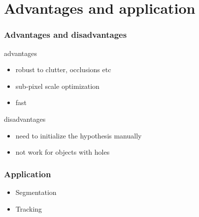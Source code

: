 \documentclass[english,10pt,presentation]{beamer}
\begin{document}
\section{Advantages and application}
\label{sec-4}
\begin{frame}
\frametitle{Advantages and disadvantages}
\label{sec-4_1}
\begin{block}{advantages}
\label{sec-4_1_1}
\begin{itemize}

\item robust to clutter, occlusions etc\\
\label{sec-4_1_1_1}%
\item sub-pixel scale optimization\\
\label{sec-4_1_1_2}%
\item fast\\
\label{sec-4_1_1_3}%
\end{itemize} %
\end{block}
\begin{alertblock}{disadvantages}
\label{sec-4_1_2}
\begin{itemize}

\item need to initialize the hypothesis manually\\
\label{sec-4_1_2_1}%
\item not work for objects with holes\\
\label{sec-4_1_2_2}%
\end{itemize} %
\end{alertblock}
\end{frame}
\begin{frame}
\frametitle{Application}
\label{sec-4_2}
\begin{itemize}

\item Segmentation\\
\label{sec-4_2_1}%
\item Tracking\\
\label{sec-4_2_2}%
\end{itemize} %
\end{frame}
\end{document}
